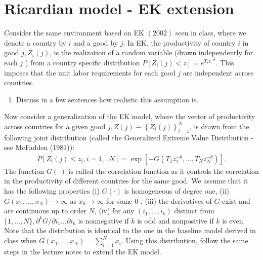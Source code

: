 \documentclass{article}
\begin{document}
\section{Ricardian model - EK extension}
Consider the same environment based on EK $(2002)$ seen in class, where we denote a country by $i$ and a good by $j$. In EK, the productivity of country $i$ in good $j, Z_i(j)$, is the realization of a random variable (drawn independently for each $j$ ) from a country specific distribution $P\left[Z_i(j)<z\right]=e^{T_i z^{-\theta}}$. This imposes that the unit labor requirements for each good $j$ are independent across countries.
\begin{enumerate}
    \item Discuss in a few sentences how realistic this assumption is.
\end{enumerate}
Now consider a generalization of the EK model, where the vector of productivity across countries for a given good $j, Z(j) \equiv\left\{Z_i(j)\right\}_{i=1}^N$, is drawn from the following joint distribution (called the Generalized Extreme Value Distribution - see McFadden (1981)):
\begin{align*}
P\left[Z_i(j) \leq z_i, i=1, . . N\right]=\exp \left[-G\left(T_1 z_1^{-\theta}, \ldots, T_N z_N^{-\theta}\right)\right] .
\end{align*}
The function $G(\cdot)$ is called the correlation function as it controls the correlation in the productivity of different countries for the same good. We assume that it has the following properties (i) $G(\cdot)$ is homogeneous of degree one, (ii) $G\left(x_1, \ldots, x_N\right) \rightarrow \infty$ as $x_0 \rightarrow \infty$ for some 0 , (iii) the derivatives of $G$ exist and are continuous up to order $N$, (iv) for any $\left(i_1, \ldots, i_k\right)$ distinct from $\{1, \ldots, N\}, \partial^k G / \partial i_1 \ldots \partial i_k$ is nonnegative if $k$ is odd and nonpositive if $k$ is even. Note that the distribution is identical to the one in the baseline model derived in class when $G\left(x_1, \ldots, x_N\right)=\sum_{i=1}^N x_i$. Using this distribution, follow the same steps in the lecture notes to extend the EK model.
\end{document}
